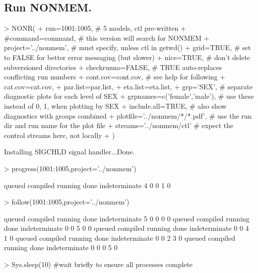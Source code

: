 \subsection{Run NONMEM.}
\begin{Schunk}
\begin{Sinput}
> NONR(
+      run=1001:1005,                       # 5 models, ctl pre-written
+      #command=command,                    # this version will search for NONMEM
+      project='../nonmem',                 # must specify, unless ctl in getwd()
+      grid=TRUE,                          # set to FALSE for better error messaging (but slower)
+      nice=TRUE,                           # don't delete subversioned directories
+      checkrunno=FALSE,                    # TRUE auto-replaces conflicting run numbers
+      cont.cov=cont.cov,                   # see help for following
+      cat.cov=cat.cov,
+      par.list=par.list,
+      eta.list=eta.list,
+      grp='SEX',                           # separate diagnostic plots for each level of SEX
+      grpnames=c('female','male'),         # use these instead of 0, 1, when plotting by SEX
+      include.all=TRUE,                    # also show diagnostics with groups combined
+      plotfile='../nonmem/*/*.pdf',        # use the run dir and run name for the plot file 
+      streams='../nonmem/ctl'              # expect the control streams here, not locally
+ )
\end{Sinput}
\begin{Soutput}
Installing SIGCHLD signal handler...Done.
\end{Soutput}
\begin{Sinput}
> progress(1001:1005,project='../nonmem')
\end{Sinput}
\begin{Soutput}
       queued      compiled       running          done indeterminate 
            4             0             0             1             0 
\end{Soutput}
\begin{Sinput}
> follow(1001:1005,project='../nonmem')
\end{Sinput}
\begin{Soutput}
       queued      compiled       running          done indeterminate 
            5             0             0             0             0 
       queued      compiled       running          done indeterminate 
            0             0             5             0             0 
       queued      compiled       running          done indeterminate 
            0             0             4             1             0 
       queued      compiled       running          done indeterminate 
            0             0             2             3             0 
       queued      compiled       running          done indeterminate 
            0             0             0             5             0 
\end{Soutput}
\begin{Sinput}
> Sys.sleep(10)                             #wait briefly to ensure all processes complete
\end{Sinput}
\end{Schunk}
